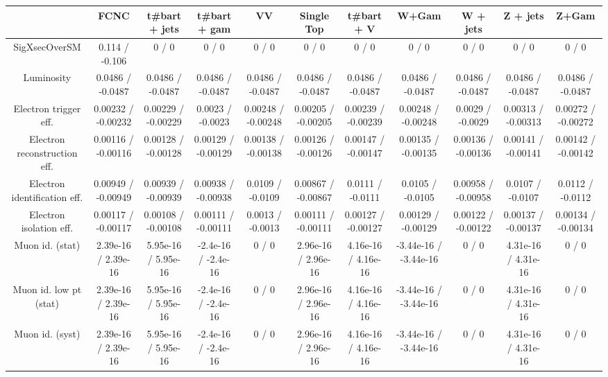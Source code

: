 \begin{table}[htbp]
\begin{center}
\footnotesize
\begin{tabular}{|c|c|c|c|c|c|c|c|c|c|c|}
\hline 
      & FCNC      & t#bar{t} + jets      & t#bar{t} +  gam      & VV      & Single Top      & t#bar{t} + V      & W+Gam      & W + jets      & Z + jets      & Z+Gam \\ 
\hline 
 SigXsecOverSM & 0.114 / -0.106 & 0 / 0 & 0 / 0 & 0 / 0 & 0 / 0 & 0 / 0 & 0 / 0 & 0 / 0 & 0 / 0 & 0 / 0 \\ 
  Luminosity & 0.0486 / -0.0487 & 0.0486 / -0.0487 & 0.0486 / -0.0487 & 0.0486 / -0.0487 & 0.0486 / -0.0487 & 0.0486 / -0.0487 & 0.0486 / -0.0487 & 0.0486 / -0.0487 & 0.0486 / -0.0487 & 0.0486 / -0.0487 \\ 
  Electron trigger eff. & 0.00232 / -0.00232 & 0.00229 / -0.00229 & 0.0023 / -0.0023 & 0.00248 / -0.00248 & 0.00205 / -0.00205 & 0.00239 / -0.00239 & 0.00248 / -0.00248 & 0.0029 / -0.0029 & 0.00313 / -0.00313 & 0.00272 / -0.00272 \\ 
  Electron reconstruction eff. & 0.00116 / -0.00116 & 0.00128 / -0.00128 & 0.00129 / -0.00129 & 0.00138 / -0.00138 & 0.00126 / -0.00126 & 0.00147 / -0.00147 & 0.00135 / -0.00135 & 0.00136 / -0.00136 & 0.00141 / -0.00141 & 0.00142 / -0.00142 \\ 
  Electron identification eff. & 0.00949 / -0.00949 & 0.00939 / -0.00939 & 0.00938 / -0.00938 & 0.0109 / -0.0109 & 0.00867 / -0.00867 & 0.0111 / -0.0111 & 0.0105 / -0.0105 & 0.00958 / -0.00958 & 0.0107 / -0.0107 & 0.0112 / -0.0112 \\ 
  Electron isolation eff. & 0.00117 / -0.00117 & 0.00108 / -0.00108 & 0.00111 / -0.00111 & 0.0013 / -0.0013 & 0.00111 / -0.00111 & 0.00127 / -0.00127 & 0.00129 / -0.00129 & 0.00122 / -0.00122 & 0.00137 / -0.00137 & 0.00134 / -0.00134 \\ 
  Muon id. (stat) & 2.39e-16 / 2.39e-16 & 5.95e-16 / 5.95e-16 & -2.4e-16 / -2.4e-16 & 0 / 0 & 2.96e-16 / 2.96e-16 & 4.16e-16 / 4.16e-16 & -3.44e-16 / -3.44e-16 & 0 / 0 & 4.31e-16 / 4.31e-16 & 0 / 0 \\ 
  Muon id. low pt (stat) & 2.39e-16 / 2.39e-16 & 5.95e-16 / 5.95e-16 & -2.4e-16 / -2.4e-16 & 0 / 0 & 2.96e-16 / 2.96e-16 & 4.16e-16 / 4.16e-16 & -3.44e-16 / -3.44e-16 & 0 / 0 & 4.31e-16 / 4.31e-16 & 0 / 0 \\ 
  Muon id. (syst) & 2.39e-16 / 2.39e-16 & 5.95e-16 / 5.95e-16 & -2.4e-16 / -2.4e-16 & 0 / 0 & 2.96e-16 / 2.96e-16 & 4.16e-16 / 4.16e-16 & -3.44e-16 / -3.44e-16 & 0 / 0 & 4.31e-16 / 4.31e-16 & 0 / 0 \\ 

\end{tabular}
\end{center}
\end{table}
